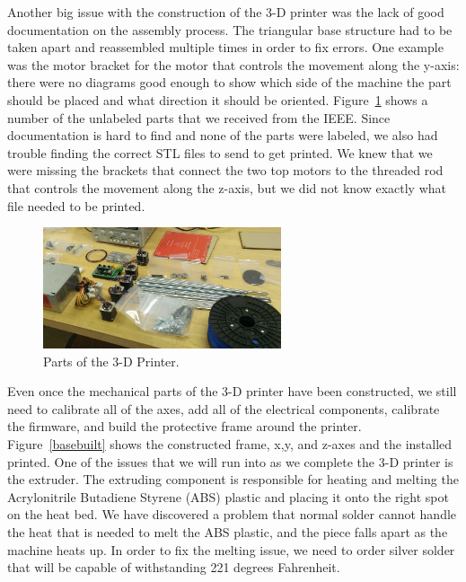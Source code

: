 \documentclass[pdftex,10.5pt]{report}
\begin{document}
Another big issue with the construction of the 3-D printer was the lack of good documentation on the assembly process. The triangular base structure had to be taken apart and reassembled multiple times in order to fix errors. One example was the motor bracket for the motor that controls the movement along the y-axis: there were no diagrams good enough to show which side of the machine the part should be placed and what direction it should be oriented. Figure~\ref{parts} shows a number of the unlabeled parts that we received from the IEEE. Since documentation is hard to find and none of the parts were labeled, we also had trouble finding the correct STL files to send to get printed. We knew that we were missing the brackets that connect the two top motors to the threaded rod that controls the movement along the z-axis, but we did not know exactly what file needed to be printed.

\begin{figure}[H]
	\centering
	\includegraphics[width=70mm]{figures/WP_20130223_002.jpg}
	\caption{Parts of the 3-D  Printer.}
	\label{parts}
\end{figure}

Even once the mechanical parts of the 3-D printer have been constructed, we still need to calibrate all of the axes, add all of the electrical components, calibrate the firmware, and build the protective frame around the printer. Figure~\ref{basebuilt} shows the constructed frame, x,y, and z-axes and the installed printed. One of the issues that we will run into as we complete the 3-D printer is the extruder. The extruding component is responsible for heating and melting the Acrylonitrile Butadiene Styrene (ABS) plastic and placing it onto the right spot on the heat bed. We have discovered a problem that normal solder cannot handle the heat that is needed to melt the ABS plastic, and the piece falls apart as the machine heats up. In order to fix the melting issue, we need to order silver solder that will be capable of withstanding 221 degrees Fahrenheit. 
\end{document}
